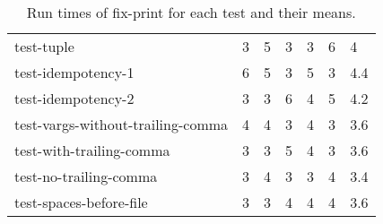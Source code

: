 \begin{table}[h!]
\begin{tabular}{@{}l|p{5em}p{5em}p{5em}p{5em}p{5em}p{5em}@{}}
    test-tuple                           & 3                          & 5                          & 3                          & 3                          & 6                          & 4                                \\
    test-idempotency-1                  & 6                          & 5                          & 3                          & 5                          & 3                          & 4.4                              \\
    test-idempotency-2                  & 3                          & 3                          & 6                          & 4                          & 5                          & 4.2                              \\
    test-vargs-without-trailing-comma & 4                          & 4                          & 3                          & 4                          & 3                          & 3.6                              \\
    test-with-trailing-comma           & 3                          & 3                          & 5                          & 4                          & 3                          & 3.6                              \\
    test-no-trailing-comma             & 3                          & 4                          & 3                          & 3                          & 4                          & 3.4                              \\ 
    test-spaces-before-file            & 3                          & 3                          & 4                          & 4                          & 4                          & 3.6                             \\ \bottomrule
    \end{tabular}
    \caption{Run times of fix-print for each test and their means.}
    \label{table:fix_print-performance}
\end{table}